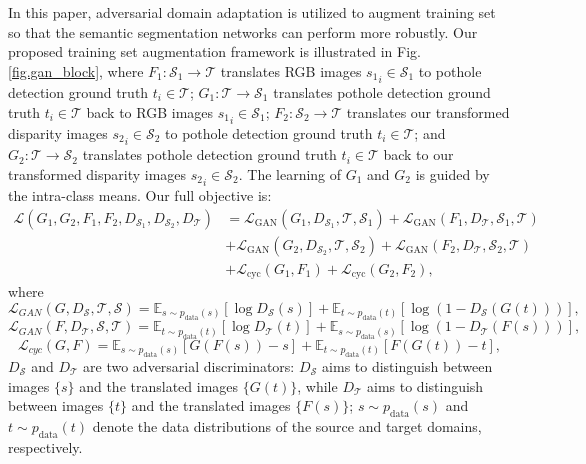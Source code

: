 \documentclass[runningheads]{llncs}
\begin{document}
In this paper, adversarial domain adaptation is utilized to augment training set so that  the semantic segmentation networks can perform more robustly. Our proposed training set augmentation framework is illustrated in Fig. \ref{fig.gan_block}, where $F_1:\mathcal{S}_1\rightarrow\mathcal{T}$ translates RGB images ${s_1}_i\in\mathcal{S}_1$ to pothole detection ground truth $t_i\in\mathcal{T}$;
$G_1:\mathcal{T}\rightarrow\mathcal{S}_1$ translates
pothole detection ground truth $t_i\in\mathcal{T}$ back to RGB images ${s_1}_i\in\mathcal{S}_1$; $F_2:\mathcal{S}_2\rightarrow\mathcal{T}$ translates our transformed disparity images ${s_2}_i\in\mathcal{S}_2$ to pothole detection ground truth $t_i\in\mathcal{T}$;
and $G_2:\mathcal{T}\rightarrow\mathcal{S}_2$ translates
pothole detection ground truth $t_i\in\mathcal{T}$ back to our transformed disparity images ${s_2}_i\in\mathcal{S}_2$. The learning of $G_1$ and $G_2$ is guided by the intra-class means. Our full objective is:
\begin{equation}
\begin{split}
\mathcal{L}(G_1,G_2,F_1,F_2,D_{\mathcal{S}_1},D_{\mathcal{S}_2},D_{\mathcal{T}})
&=\mathcal{L}_\text{GAN}(G_1,D_{\mathcal{S}_1},\mathcal{T},{\mathcal{S}_1})+\mathcal{L}_\text{GAN}(F_1,D_{\mathcal{T}},{\mathcal{S}_1},\mathcal{T})\\
&+\mathcal{L}_\text{GAN}(G_2,D_{\mathcal{S}_2},\mathcal{T},{\mathcal{S}_2})+\mathcal{L}_\text{GAN}(F_2,D_{\mathcal{T}},{\mathcal{S}_2},\mathcal{T})\\
&+\mathcal{L}_\text{cyc}(G_1,F_1)+\mathcal{L}_\text{cyc}(G_2,F_2),
\end{split}
\end{equation}
where
\begin{equation}
\mathcal{L}_{GAN}(G,D_\mathcal{S},\mathcal{T},\mathcal{S})=
\mathbb{E}_{s\sim p_\text{data}(s)}[\log D_\mathcal{S}(s)]
+\mathbb{E}_{t\sim p_\text{data}(t)}[\log (1-D_\mathcal{S}(G(t)))],
\end{equation}
\begin{equation}
\mathcal{L}_{GAN}(F,D_\mathcal{T},\mathcal{S},\mathcal{T})=
\mathbb{E}_{t\sim p_\text{data}(t)}[\log D_\mathcal{T}(t)]
+\mathbb{E}_{s\sim p_\text{data}(s)}[\log (1-D_\mathcal{T}(F(s)))],
\end{equation}
\begin{equation}
\mathcal{L}_{cyc}(G,F)=
\mathbb{E}_{s\sim p_\text{data}(s)}[G(F(s))-s]
+\mathbb{E}_{t\sim p_\text{data}(t)}[F(G(t))-t],
\end{equation}
$D_\mathcal{S}$ and $D_\mathcal{T}$ are two adversarial discriminators: $D_\mathcal{S}$ aims to distinguish between images $\{s\}$ and the translated images $\{G(t)\}$, while $D_\mathcal{T}$ aims to distinguish between images $\{t\}$ and the translated images $\{F(s)\}$; $s\sim p_\text{data}(s)$ and $t\sim p_\text{data}(t)$ denote the data distributions of the source and target domains, respectively.
\end{document}
